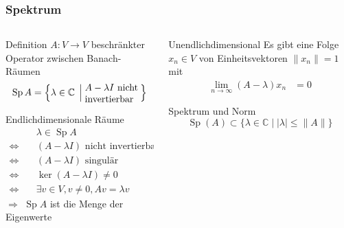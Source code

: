 %
%
%
\begin{frame}[t]
\setlength{\abovedisplayskip}{5pt}
\setlength{\belowdisplayskip}{5pt}
\frametitle{Spektrum}
\vspace{-15pt}
\begin{columns}[t,onlytextwidth]
\begin{column}{0.48\textwidth}
\begin{block}{Definition}
$A\colon V\to V$ beschränkter Operator zwischen Banach-Räumen
\[
\operatorname{Sp}A
=
\left\{
\lambda\in\mathbb{C}
\;\left|\;
\begin{minipage}{2cm}\raggedright
$A-\lambda I$ nicht invertierbar
\end{minipage}
\right.
\right\}
\]
\end{block}
\begin{block}{Endlichdimensionale Räume}
\vspace{-15pt}
\begin{align*}
&\lambda\in\operatorname{Sp}A
\\
\Leftrightarrow\quad&\text{$(A-\lambda I)$ nicht invertierbar}
\\
\Leftrightarrow\quad&\text{$(A-\lambda I)$ singulär}
\\
\Leftrightarrow\quad&\ker(A-\lambda I)\ne 0
\\
\Leftrightarrow\quad&\exists v\in V, v\ne 0, Av=\lambda v
\end{align*}
$\Rightarrow$ $\operatorname{Sp}A$ ist die Menge der Eigenwerte
\end{block}
\end{column}
\begin{column}{0.48\textwidth}
\begin{block}{Unendlichdimensional}
Es gibt eine Folge $x_n\in V$ von Einheitsvektoren
$\|x_n\|=1$
mit
\begin{align*}
\lim_{n\to\infty} (A - \lambda)x_n &= 0
\end{align*}
\end{block}
\begin{block}{Spektrum und Norm}
\[
\operatorname{Sp}(A)
\subset
\{\lambda\in\mathbb{C}\;|\;
|\lambda|\le \|A\|\}
\]
\end{block}
\end{column}
\end{columns}
\end{frame}
